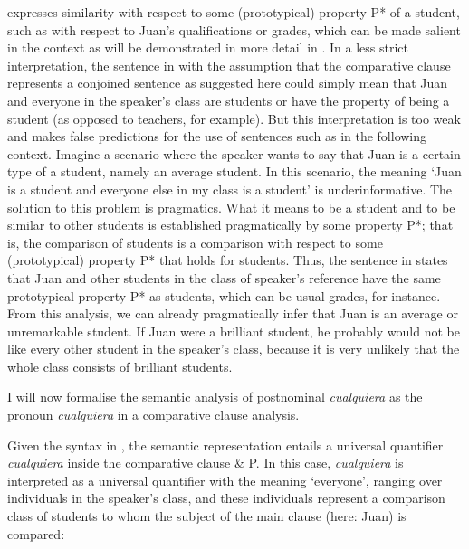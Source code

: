 {\largerpage
{} expresses similarity with respect to some (prototypical) property P* of a student, such as with respect to Juan’s qualifications or grades, which can be made salient in the context as will be demonstrated in more detail in . In a less strict interpretation, the sentence in  with the assumption that the comparative clause represents a conjoined sentence as suggested here could simply mean that Juan and everyone in the speaker’s class are students or have the property of being a student (as opposed to teachers, for example). But this interpretation is too weak and makes false predictions for the use of sentences such as  in the following context. Imagine a scenario where the speaker wants to say that Juan is a certain type of a student, namely an average student. In this scenario, the meaning ‘Juan is a student and everyone else in my class is a student’ is underinformative. The solution to this problem is pragmatics. What it means to be a student and to be similar to other students is established pragmatically by some property P*; that is, the comparison of students is a comparison with respect to some (prototypical) property P* that holds for students. Thus, the sentence in   states that Juan and other students in the class of speaker’s reference have the same prototypical property P* as students, which can be usual grades, for instance. From this analysis, we can already pragmatically infer that Juan is an average or unremarkable student. If Juan were a brilliant student, he probably would not be like every other student in the speaker’s class, because it is very unlikely that the whole class consists of brilliant students.

I will now formalise the semantic analysis of postnominal \textit{cualquiera} as the pronoun \textit{cualquiera} in a comparative clause analysis.

Given the syntax in , the semantic representation entails a universal quantifier \textit{cualquiera} inside the comparative clause \& P. In this case, \textit{cualquiera} is interpreted as a universal quantifier with the meaning ‘everyone’, ranging over individuals in the speaker’s class, and these individuals represent a comparison class of students to whom the subject of the main clause (here: Juan) is compared:

}
